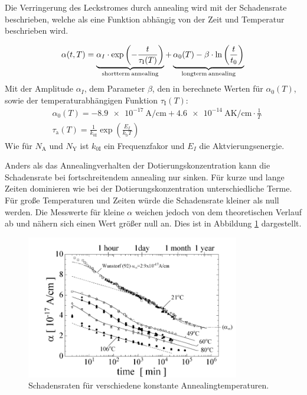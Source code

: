 Die Verringerung des Leckstromes durch annealing wird mit der Schadensrate
beschrieben, welche als eine Funktion abhängig von der Zeit und
Temperatur beschrieben wird.\cite{moll}

\begin{align}
  \alpha(t, T) = \underbrace{\alpha_I \cdot \exp{\left(-\frac{t}{\tau_{\mathrm{I}}(T)}\right)}}_{\mathrm{shortterm \: annealing}} + \underbrace{\alpha_{\mathrm{0}}(T) -\beta \cdot \ln{\left(\frac{t}{t_{\mathrm{0}}}\right)}}_{\mathrm{longterm \: annealing}} \text{\label{eqn:damage}}
\end{align}
Mit der Amplitude $\alpha_I$, dem Parameter $\beta$, den in \cite{moll} berechnete Werten für $\alpha_{\mathrm{0}}(T)$, sowie der
temperaturabhängigen Funktion $\tau_{\mathrm{I}}(T)$:
\begin{align}
  &\alpha_{\mathrm{0}}(T) = \SI{-8.9e-17}{\ampere\per\centi\meter} + \SI{4.6e-14}{\ampere\kelvin\per\centi\meter} \cdot \frac{1}{T} \\
  &\tau_{\mathrm{a}}(T) = \frac{1}{k_{0\mathrm{I}}}\exp{\left(\frac{E_{I}}{k_{\mathrm{b}}T}\right)}
\end{align}
Wie für $N_{\mathrm{A}}$ und $N_{\mathrm{Y}}$ ist $k_{0\mathrm{I}}$ ein Frequenzfakor und $E_{I}$ die Aktvierungsenergie.

Anders als das Annealingverhalten der Dotierungskonzentration kann die Schadensrate
bei fortschreitendem annealing nur sinken. Für kurze und
lange Zeiten dominieren wie bei der Dotierungskonzentration unterschiedliche
Terme. Für große Temperaturen und Zeiten würde die Schadensrate kleiner als null
werden. Die Messwerte für kleine $\alpha$ weichen jedoch von dem
theoretischen Verlauf ab und nähern sich einen Wert größer null an. Dies
ist in Abbildung \ref{fig:damage_rates} dargestellt.

\begin{figure}
  \includegraphics[width=0.83\textwidth]{logos/schadensraten.PNG}
  \caption{Schadensraten für verschiedene konstante Annealingtemperaturen.\cite{moll}}
  \label{fig:damage_rates}
\end{figure}
